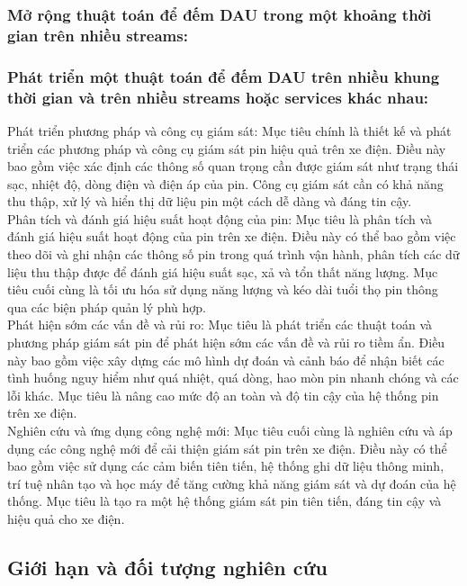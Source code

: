 \documentclass[a4paper,11pt]{article}
\theoremstyle{mytheor}
\begin{document}
\subsubsection{Mở rộng thuật toán để đếm DAU trong một khoảng thời gian trên nhiều streams:}
\subsubsection{Phát triển một thuật toán để đếm DAU trên nhiều khung thời gian và trên nhiều streams hoặc services khác nhau:}
Phát triển phương pháp và công cụ giám sát: Mục tiêu chính là thiết kế và phát triển các phương pháp và công cụ giám sát pin hiệu quả trên xe điện. Điều này bao gồm việc xác định các thông số quan trọng cần được giám sát như trạng thái sạc, nhiệt độ, dòng điện và điện áp của pin. Công cụ giám sát cần có khả năng thu thập, xử lý và hiển thị dữ liệu pin một cách dễ dàng và đáng tin cậy.\\
Phân tích và đánh giá hiệu suất hoạt động của pin: Mục tiêu là phân tích và đánh giá hiệu suất hoạt động của pin trên xe điện. Điều này có thể bao gồm việc theo dõi và ghi nhận các thông số pin trong quá trình vận hành, phân tích các dữ liệu thu thập được để đánh giá hiệu suất sạc, xả và tổn thất năng lượng. Mục tiêu cuối cùng là tối ưu hóa sử dụng năng lượng và kéo dài tuổi thọ pin thông qua các biện pháp quản lý phù hợp.\\
Phát hiện sớm các vấn đề và rủi ro: Mục tiêu là phát triển các thuật toán và phương pháp giám sát pin để phát hiện sớm các vấn đề và rủi ro tiềm ẩn. Điều này bao gồm việc xây dựng các mô hình dự đoán và cảnh báo để nhận biết các tình huống nguy hiểm như quá nhiệt, quá dòng, hao mòn pin nhanh chóng và các lỗi khác. Mục tiêu là nâng cao mức độ an toàn và độ tin cậy của hệ thống pin trên xe điện.\\
Nghiên cứu và ứng dụng công nghệ mới: Mục tiêu cuối cùng là nghiên cứu và áp dụng các công nghệ mới để cải thiện giám sát pin trên xe điện. Điều này có thể bao gồm việc sử dụng các cảm biến tiên tiến, hệ thống ghi dữ liệu thông minh, trí tuệ nhân tạo và học máy để tăng cường khả năng giám sát và dự đoán của hệ thống. Mục tiêu là tạo ra một hệ thống giám sát pin tiên tiến, đáng tin cậy và hiệu quả cho xe điện.

\subsection{Giới hạn và đối tượng nghiên cứu }
\end{document}
